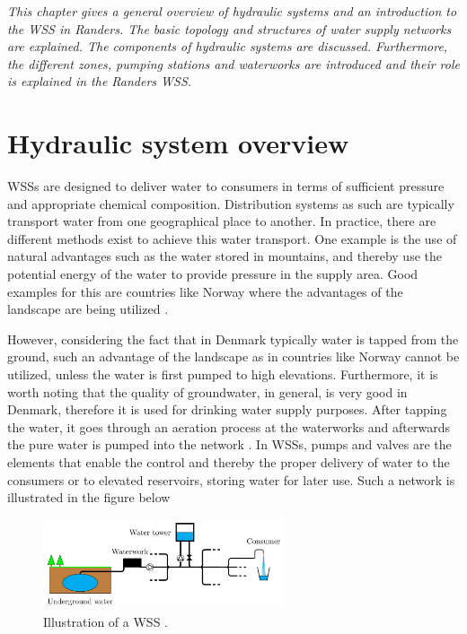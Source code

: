 \emph{This chapter gives a general overview of hydraulic systems and an introduction to the WSS in Randers. The basic topology and structures of water supply networks are explained. The components of hydraulic systems are discussed. Furthermore, the different zones, pumping stations and waterworks are introduced and their role is explained in the Randers WSS.}

\section{Hydraulic system overview}
\label{hydraulic_system_overview}

WSSs are designed to deliver water to consumers in terms of sufficient pressure and appropriate chemical composition. Distribution systems as such are typically transport water from one geographical place to another. In practice, there are different methods exist to achieve this water transport. One example is the use of natural advantages such as the water stored in mountains, and thereby use the potential energy of the water to provide pressure in the supply area. Good examples for this are countries like Norway where the advantages of the landscape are being utilized \cite{norway_mountains}. 

However, considering the fact that in Denmark typically water is tapped from the ground, such an advantage of the landscape as in countries like Norway cannot be utilized, unless the water is first pumped to high elevations. Furthermore, it is worth noting that the quality of groundwater, in general, is very good in Denmark, therefore it is used for drinking water supply purposes. After tapping the water, it goes through an aeration process at the waterworks and afterwards the pure water is pumped into the network \cite{prahata}. In WSSs, pumps and valves are the elements that enable the control and thereby the proper delivery of water to the consumers or to elevated reservoirs, storing water for later use. Such a network is illustrated in the figure below

\begin{figure}[H]
\centering
\includegraphics[width=0.63\textwidth]{report/pictures/WSS_illustration}
\caption{Illustration of a WSS \cite{kenneth_houe}.}
\label{fig:WSS_example}
\end{figure}

